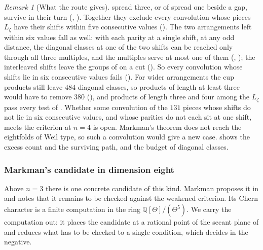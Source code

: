 \documentclass[11pt,reqno]{amsart}
\theoremstyle{plain}
\theoremstyle{definition}
\theoremstyle{remark}
\newtheorem{remark}[theorem]{Remark}
\newcommand{\QQ}{\mathbb{Q}}
\begin{document}
\begin{remark}[What the route gives]
spread three, or of spread one beside a gap, survive in their turn
(, ). Together they exclude
every convolution whose pieces $L_{\zeta}$ have their shifts within five
consecutive values (). The two arrangements left within
six values fall as well: with each parity at a single shift, at any odd
distance, the diagonal classes at one of the two shifts can be reached only
through all three multiples, and the multiples serve at most one of them
(, ); the interleaved shifts
leave the groups of  on a cut
(). So every convolution whose shifts lie in six
consecutive values fails (). For wider arrangements the
cup products still leave $484$ diagonal classes, so products of length at
least three would have to remove $380$ (), and
products of length three and four among the $L_{\zeta}$ pass every test of
. Whether some convolution of the $131$ pieces whose
shifts do not lie in six consecutive values, and whose parities do not each
sit at one shift, meets the criterion at $n=4$ is open. Markman's theorem
does not reach the eightfolds of Weil type, so such a convolution would give
a new case.
 shows the excess count and the
surviving path, and  the budget of diagonal
classes.
\end{remark}
\subsubsection*{Markman's candidate in dimension eight}

Above $n=3$ there is one concrete candidate of this kind. Markman proposes
it in \cite[Section 12]{Mar25b} and notes that it remains to be checked
against the weakened criterion. Its Chern character is a finite computation
in the ring $\QQ[\Theta]/(\Theta^{5})$. We carry the computation out: it
places the candidate at a rational point of the secant plane of
\cite[Definition~14.4]{paperI} and reduces what has to be checked to a single
condition, which  decides in the negative.
\end{document}
